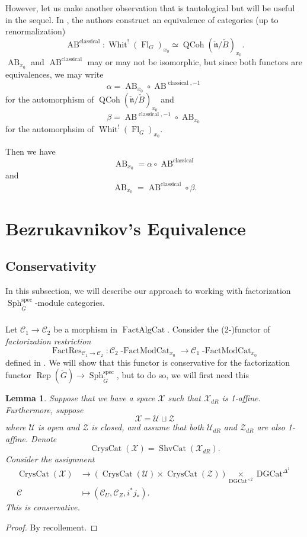 \documentclass[10pt]{amsart}
\newtheorem{lem}[subsubsection]{Lemma}
\theoremstyle{remark}
\newcommand{\on}[1]{\operatorname{#1}}
\newcommand{\Gcheck}{\check{G}}
\newcommand{\ncheck}{\check{\mathfrak{n}}}
\newcommand{\Bcheck}{\check{B}}
\newcommand{\FactAlgCat}{\on{FactAlgCat}}
\newcommand{\sssec}[1]{\subsubsection{}}
\begin{document}
\sssec{}
However, let us make another observation that is tautological but will be useful in the sequel. In \cite{AB}, the authors construct an equivalence of categories (up to renormalization)
$$
\on{AB}^{\on{classical}} : \on{Whit}^!(\on{Fl}_G)_{x_0} \simeq \on{QCoh}(\ncheck/\Bcheck)_{x_0}.
$$
$\on{AB}_{x_0}$ and $\on{AB}^{\on{classical}}$ may or may not be isomorphic, but since both functors are equivalences, we may write
$$
\alpha = \on{AB}_{x_0} \circ \on{AB}^{\on{classical}, -1}
$$
for the automorphism of $\on{QCoh}(\ncheck/\Bcheck)_{x_0}$ and
$$
\beta = \on{AB}^{\on{classical}, -1} \circ \on{AB}_{x_0}
$$
for the automorphsim of $\on{Whit}^!(\on{Fl}_G)_{x_0}$.

Then we have
$$
\on{AB}_{x_0} = \alpha \circ \on{AB}^{\on{classical}}
$$
and
$$
\on{AB}_{x_0} = \on{AB}^{\on{classical}} \circ \beta.
$$

\section{Bezrukavnikov's Equivalence} \label{Section B}
\subsection{Conservativity} \label{Conservativity}
In this subsection, we will describe our approach to working with factorization $\on{Sph}_{\Gcheck}^{\on{spec}}$-module categories.

\sssec{}
Let $\mathcal{C}_1 \to \mathcal{C}_2$ be a morphism in $\FactAlgCat$. Consider the (2-)functor of \emph{factorization restriction}
$$
\on{FactRes}_{\mathcal{C}_1 \to \mathcal{C}_2} : \mathcal{C}_2 \on{-FactModCat}_{x_0} \longrightarrow \mathcal{C}_1 \on{-FactModCat}_{x_0}
$$
defined in \cite{CF}. We will show that this functor is conservative for the factorization functor $\on{Rep}(\Gcheck) \to \on{Sph}_{\Gcheck}^{\on{spec}}$, but to do so, we will first need this

\begin{lem}
    Suppose that we have a space $\mathcal{X}$ such that $\mathcal{X}_{dR}$ is 1-affine. Furthermore, suppose 
    $$
    \mathcal{X} = \mathcal{U} \sqcup \mathcal{Z}
    $$
    where $\mathcal{U}$ is open and $\mathcal{Z}$ is closed, and assume that both $\mathcal{U}_{dR}$ and $\mathcal{Z}_{dR}$ are also 1-affine.
    Denote 
    $$
    \on{CrysCat}(\mathcal{X}) = \on{ShvCat}(\mathcal{X}_{dR}).
    $$
    Consider the assignment
    \begin{align}
    \on{CrysCat}(\mathcal{X}) &\longrightarrow (\on{CrysCat}(\mathcal{U}) \times \on{CrysCat}(\mathcal{Z})) \underset{\on{DGCat^{\times 2}}}{\times} \on{DGCat}^{\Delta^1} \\
    \mathcal{C} &\longmapsto (\mathcal{C}_U, \mathcal{C}_Z, i^*j_*).
    \end{align}
    This is conservative.
\end{lem}
\begin{proof}
    By recollement.
\end{proof}
\end{document}
